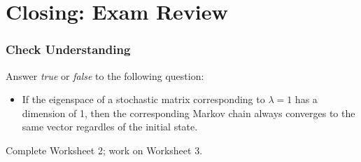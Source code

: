 \documentclass{beamer}
\begin{document}
	\section{Closing: Exam Review}
	\begin{frame}
		\frametitle{Check Understanding}
	Answer \textit{true} or \textit{false} to the following question:
		\begin{itemize}
			\item<1-> If the eigenspace of a stochastic matrix corresponding to \(\lambda = 1\) has a dimension of 1, then the corresponding Markov chain
					always converges to the same vector regardles of the initial state.
		\end{itemize} \pause 
		Complete Worksheet 2; work on Worksheet 3. 
	\end{frame}
\end{document}
